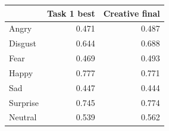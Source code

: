 \begin{tabular}{lrr}
\toprule
 & Task 1 best & Creative final \\
\midrule
Angry & 0.471 & 0.487 \\
Disgust & 0.644 & 0.688 \\
Fear & 0.469 & 0.493 \\
Happy & 0.777 & 0.771 \\
Sad & 0.447 & 0.444 \\
Surprise & 0.745 & 0.774 \\
Neutral & 0.539 & 0.562 \\
\bottomrule
\end{tabular}
